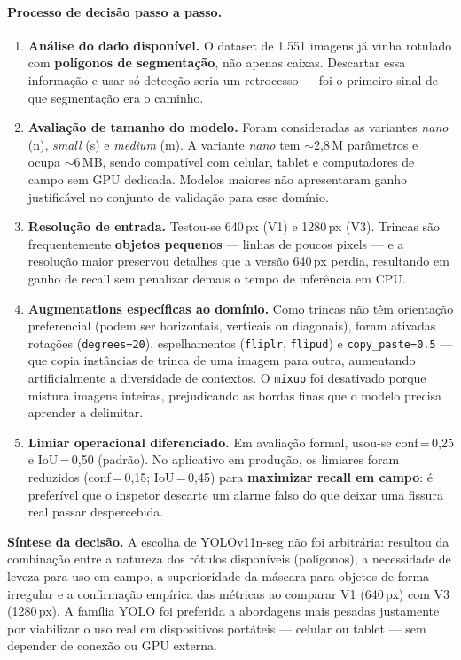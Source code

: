 \documentclass[11pt,a4paper]{article}
\begin{document}
\paragraph{Processo de decisão passo a passo.}
\begin{enumerate}[leftmargin=1.6em]
  \item \textbf{Análise do dado disponível.} O dataset de 1.551 imagens já vinha rotulado com
        \textbf{polígonos de segmentação}, não apenas caixas. Descartar essa informação e usar
        só detecção seria um retrocesso — foi o primeiro sinal de que segmentação era o caminho.
  \item \textbf{Avaliação de tamanho do modelo.} Foram consideradas as variantes
        \emph{nano} (n), \emph{small} (s) e \emph{medium} (m). A variante \emph{nano} tem
        \(\sim\)2,8\,M parâmetros e ocupa \(\sim\)6\,MB, sendo compatível com celular,
        tablet e computadores de campo sem GPU dedicada. Modelos maiores não apresentaram
        ganho justificável no conjunto de validação para esse domínio.
  \item \textbf{Resolução de entrada.} Testou-se 640\,px (V1) e 1280\,px (V3).
        Trincas são frequentemente \textbf{objetos pequenos} — linhas de poucos pixels —
        e a resolução maior preservou detalhes que a versão 640\,px perdia, resultando em
        ganho de recall sem penalizar demais o tempo de inferência em CPU.
  \item \textbf{Augmentations específicas ao domínio.} Como trincas não têm orientação
        preferencial (podem ser horizontais, verticais ou diagonais), foram ativadas rotações
        (\texttt{degrees=20}), espelhamentos (\texttt{fliplr}, \texttt{flipud}) e
        \texttt{copy\_paste=0.5} — que copia instâncias de trinca de uma imagem para outra,
        aumentando artificialmente a diversidade de contextos. O \texttt{mixup} foi desativado
        porque mistura imagens inteiras, prejudicando as bordas finas que o modelo precisa
        aprender a delimitar.
  \item \textbf{Limiar operacional diferenciado.} Em avaliação formal, usou-se
        conf\,=\,0,25 e IoU\,=\,0,50 (padrão). No aplicativo em produção, os limiares foram
        reduzidos (conf\,=\,0,15; IoU\,=\,0,45) para \textbf{maximizar recall em campo}: é
        preferível que o inspetor descarte um alarme falso do que deixar uma fissura real passar
        despercebida.
\end{enumerate}

\begin{infobox}
\textbf{Síntese da decisão.} A escolha de YOLOv11n-seg não foi arbitrária: resultou da
combinação entre a natureza dos rótulos disponíveis (polígonos), a necessidade de leveza para
uso em campo, a superioridade da máscara para objetos de forma irregular e a confirmação
empírica das métricas ao comparar V1 (640\,px) com V3 (1280\,px). A família YOLO foi preferida
a abordagens mais pesadas justamente por viabilizar o uso real em dispositivos portáteis —
celular ou tablet — sem depender de conexão ou GPU externa.
\end{infobox}
\end{document}
